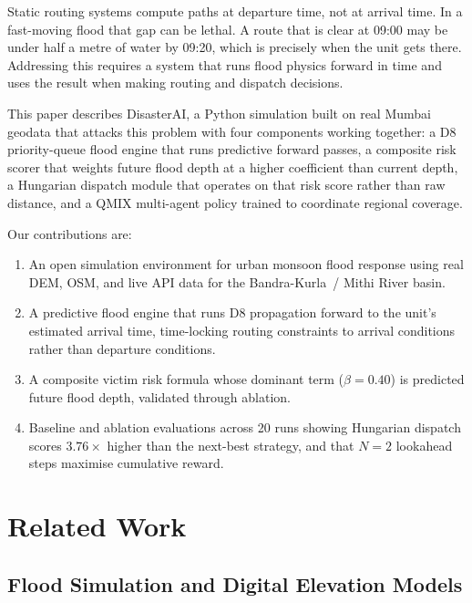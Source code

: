 \documentclass[conference]{IEEEtran}
\begin{document}
Static routing systems compute paths at departure time, not at arrival time.
In a fast-moving flood that gap can be lethal.
A route that is clear at 09:00 may be under half a metre of water by 09:20,
which is precisely when the unit gets there.
Addressing this requires a system that runs flood physics forward in time and
uses the result when making routing and dispatch decisions.

This paper describes DisasterAI, a Python simulation built on real Mumbai
geodata that attacks this problem with four components working together:
a D8 priority-queue flood engine that runs predictive forward passes,
a composite risk scorer that weights future flood depth at a higher coefficient
than current depth, a Hungarian dispatch module that operates on that risk
score rather than raw distance, and a QMIX multi-agent policy trained to
coordinate regional coverage.

Our contributions are:
\begin{enumerate}
  \item An open simulation environment for urban monsoon flood response using
    real DEM, OSM, and live API data for the Bandra-Kurla~/ Mithi River basin.
  \item A predictive flood engine that runs D8 propagation forward to the
    unit's estimated arrival time, time-locking routing constraints to arrival
    conditions rather than departure conditions.
  \item A composite victim risk formula whose dominant term ($\beta = 0.40$)
    is predicted future flood depth, validated through ablation.
  \item Baseline and ablation evaluations across 20 runs showing Hungarian
    dispatch scores $3.76\times$ higher than the next-best strategy, and that
    $N=2$ lookahead steps maximise cumulative reward.
\end{enumerate}

\section{Related Work}
\label{sec:related}

\subsection{Flood Simulation and Digital Elevation Models}
\end{document}
